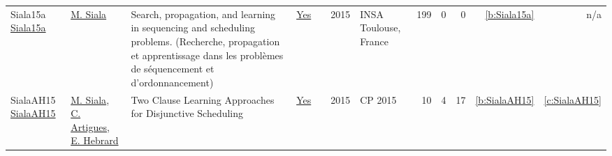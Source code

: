{\begin{longtable}{>{\raggedright\arraybackslash}p{3cm}>{\raggedright\arraybackslash}p{6cm}>{\raggedright\arraybackslash}p{6.5cm}rrrp{2.5cm}rrrrr}
Siala15a \href{https://tel.archives-ouvertes.fr/tel-01164291}{Siala15a} & \hyperref[auth:a130]{M. Siala} & Search, propagation, and learning in sequencing and scheduling problems. (Recherche, propagation et apprentissage dans les probl{\`{e}}mes de s{\'{e}}quencement et d'ordonnancement) & \href{works/Siala15a.pdf}{Yes} & \cite{Siala15a} & 2015 & {INSA} Toulouse, France & 199 & 0 & 0 & \ref{b:Siala15a} & n/a\\
SialaAH15 \href{https://doi.org/10.1007/978-3-319-23219-5\_28}{SialaAH15} & \hyperref[auth:a130]{M. Siala}, \hyperref[auth:a6]{C. Artigues}, \hyperref[auth:a1]{E. Hebrard} & Two Clause Learning Approaches for Disjunctive Scheduling & \href{works/SialaAH15.pdf}{Yes} & \cite{SialaAH15} & 2015 & CP 2015 & 10 & 4 & 17 & \ref{b:SialaAH15} & \ref{c:SialaAH15}\\
\end{longtable}
}

